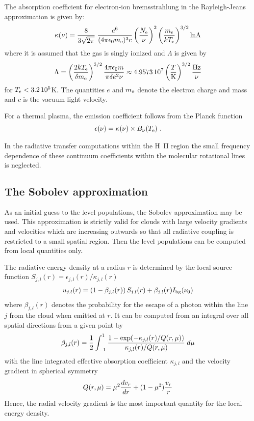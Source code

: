 The absorption coefficient for electron-ion bremsstrahlung in the
Rayleigh-Jeans approximation is given by:
\begin{equation}
\kappa(\nu)={8 \over 3\sqrt{2\pi}}\; {e^6 \over (4\pi\epsilon_0 m_{\rm e})^3 c}
\left(N_{\rm e} \over \nu\right)^2 \left(m_{\rm e}\over k T_{\rm e}\right)^{3/2}
{\rm ln}\Lambda
\end{equation}
where it is assumed that the gas is singly ionized and $\Lambda$ is 
given by
\begin{equation}
\Lambda=\left(2k T_{\rm e} \over \delta m_{\rm e}\right)^{3/2} 
{4\pi \epsilon_0 m \over \pi\delta e^2 \nu} \approx
4.9573\,10^7 \left(T\over {\rm K}\right)^{3/2} {{\rm Hz} \over \nu}
\end{equation}
for $T_{\rm e}<3.2\,10^5$K. The quantities $e$ and $m_{\rm e}$ denote the
electron charge and mass and $c$ is the vacuum light velocity.

For a thermal plasma, the emission coefficient follows
from the Planck function
\begin{equation}
\epsilon(\nu)=\kappa(\nu)\times B_\nu(T_{\rm e})\;.
\end{equation}

In the radiative transfer computations within the H~II region the
small frequency dependence of these continuum coefficients within the
molecular rotational lines is neglected.


\subsection{The Sobolev approximation}

As an initial guess to the level populations, the Sobolev approximation
may be used. This approximation is strictly valid for clouds with large 
velocity 
gradients  and velocities which are increasing outwards so that
all radiative coupling is restricted to a small spatial region. 
Then the level populations can be computed from local quantities only. 

The radiative energy density at a radius $r$ is determined by the
local source function $S_{j,l}(r)=\epsilon_{j,l}(r)/\kappa_{j,l}(r)$ 
\begin{equation}
u_{j,l}(r) = \left(1-\beta_{j,l}(r)\right)S_{j,l}(r) + \beta_{j,l}(r) I_{\rm bg}(\nu_0)
\label{sobolev}
\end{equation}
where $\beta_{j,l}(r)$ denotes the probability for the escape of a photon
within the line $j$ from the cloud when emitted at $r$.
It can be computed from an integral over all spatial directions
from a given point by
\begin{equation}
\beta_{j,l}(r) = {1\over 2}\int_{-1}^1 {1-\exp(-\kappa_{j,l}(r)/Q(r,\mu))
\over \kappa_{j,l}(r)/Q(r,\mu)} \;d\mu
\end{equation}
with the line integrated effective absorption coefficient $\kappa_{j,l}$ and 
the velocity gradient in spherical symmetry
\begin{equation}
Q(r,\mu)=\mu^2{dv_r\over dr}+(1-\mu^2){v_r\over r}
\label{velgradient}
\end{equation}
Hence, the radial velocity gradient is the most
important quantity for the local energy density.

